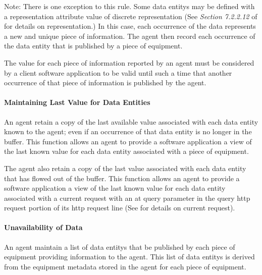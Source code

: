 \begin{note}
Note:	There is one exception to this rule.  Some \glspl{data entity} may be defined with a \gls{representation} attribute value of \gls{discrete representation} (See \textit{Section 7.2.2.12} of  for details on \gls{representation}.)  In this case, each occurrence of the data represents a new and unique piece of information.  The \gls{agent} \MUST then record each occurrence of the \gls{data entity} that is published by a piece of equipment.

\end{note}

The value for each piece of information reported by an \gls{agent} must be considered by a client software application to be valid until such a time that another occurrence of that piece of information is published by the \gls{agent}.

\paragraph{Maintaining Last Value for Data Entities}\mbox{}

An \gls{agent} \MUST retain a copy of the last available value associated with each \gls{data entity} known to the \gls{agent}; even if an occurrence of that \gls{data entity} is no longer in the \gls{buffer}.  This function allows an \gls{agent} to provide a software application a view of the last known value for each \gls{data entity} associated with a piece of equipment.

The \gls{agent} \MUST also retain a copy of the last value associated with each \gls{data entity} that has flowed out of the \gls{buffer}.  This function allows an \gls{agent} to provide a software application a view of the last known value for each \gls{data entity} associated with a \gls{current request} with an \gls{at query} parameter in the \gls{query http request} portion of its \gls{http request line} (See  for details on \gls{current request}).

\newpage

\paragraph{Unavailability of Data}\mbox{}

An \gls{agent} \MUST maintain a list of \glspl{data entity} that \MAY be published by each piece of equipment providing information to the \gls{agent}.   This list of \glspl{data entity} is derived from the \gls{equipment metadata} stored in the \gls{agent} for each piece of equipment.

